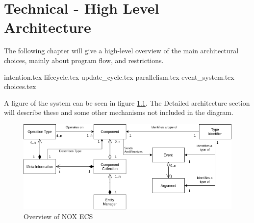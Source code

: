 \chapter{Technical - High Level Architecture}
\label{chap:technical_high_level_architecture}
The following chapter will give a high-level overview of the main architectural
choices, mainly about program flow, and restrictions.

{intention.tex}
{lifecycle.tex}
{update_cycle.tex}
{parallelism.tex}
{event_system.tex}
{choices.tex}

A figure of the system can be seen in figure \ref{fig:nox_ecs_uml}.
The Detailed architecture section will describe these and some other mechanisms not included in the diagram.

\begin{figure}[tbp]
    \begin{center}
    \includegraphics[scale=0.45]{images/nox_ecs_uml.png}
    \caption{Overview of NOX ECS}
    \label{fig:nox_ecs_uml}
    \end{center}
\end{figure}
